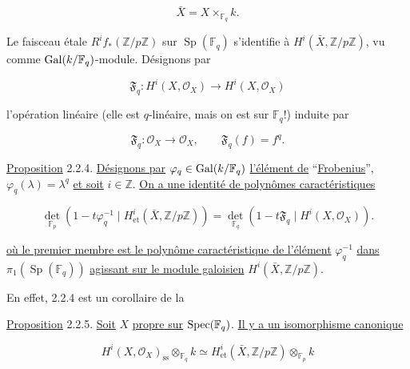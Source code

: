 \begin{equation}\tag{2.2.1}
\bar X=X\times_{\mathbb F_q}k.
\end{equation}

Le faisceau étale $R^if_*(\mathbb Z/p\mathbb Z)$ sur
$\operatorname{Sp}(\mathbb F_q)$ s'identifie à
$H^i(\bar X,\mathbb Z/p\mathbb Z)$, vu comme
$\operatorname{Gal}(k/\mathbb F_q)$-module. Désignons par

\begin{equation}\tag{2.2.2}
\mathfrak F_q:H^i(X,\mathcal O_X)\longrightarrow H^i(X,\mathcal O_X)
\end{equation}

l'opération linéaire (elle est $q$-linéaire, mais on est sur $\mathbb F_q$!)
induite par

\begin{equation}\tag{2.2.3}
\mathfrak F_q:\mathcal O_X\longrightarrow\mathcal O_X,
\qquad \mathfrak F_q(f)=f^q.
\end{equation}

\underline{Proposition} 2.2.4. \underline{Désignons par}
$\varphi_q\in\operatorname{Gal}(k/\mathbb F_q)$ \underline{l'élément de} ``\underline{Frobenius}'',
$\varphi_q(\lambda)=\lambda^q$ \underline{et soit} $i\in\mathbb Z$. \underline{On a une identité de
polynômes caractéristiques}

\begin{equation}\tag{2.2.4.1}
\det_{\mathbb F_p}\!\left(
1-t\varphi_q^{-1}\mid H^i_{\mathrm{et}}(\bar X,\mathbb Z/p\mathbb Z)
\right)
=
\det_{\mathbb F_q}\!\left(
1-t\mathfrak F_q\mid H^i(X,\mathcal O_X)
\right).
\end{equation}

\underline{où le premier membre est le polynôme caractéristique de l'élément}
$\varphi_q^{-1}$ \underline{dans} $\pi_1(\operatorname{Sp}(\mathbb F_q))$ \underline{agissant sur le
module galoisien} $H^i(\bar X,\mathbb Z/p\mathbb Z)$.

En effet, 2.2.4 est un corollaire de la


\underline{Proposition} 2.2.5. \underline{Soit} $X$ \underline{propre sur}
$\operatorname{Spec}(\mathbb F_q)$. \underline{Il y a un isomorphisme canonique}

\begin{equation}\tag{2.2.6}
H^i(X,\mathcal O_X)_{\mathrm{ss}}\otimes_{\mathbb F_q}k
\simeq
H^i_{\mathrm{et}}(\bar X,\mathbb Z/p\mathbb Z)
\otimes_{\mathbb F_p}k
\end{equation}


